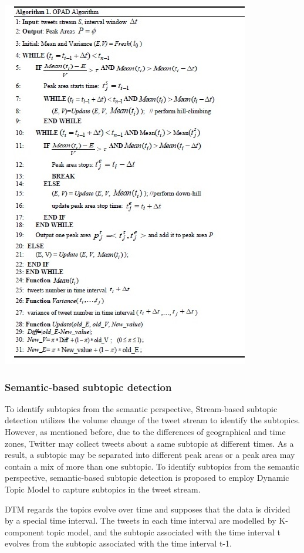 \documentclass[conference]{IEEEtran}
\begin{document}
\begin{center}
\includegraphics[scale=0.80]{OPAD1.jpg}
\end{center}


\subsubsection{\textbf{Semantic-based subtopic detection}}
\par To identify subtopics from the semantic perspective, Stream-based subtopic detection utilizes the volume change of the tweet stream to identify the subtopics. However, as mentioned before, due to the differences of geographical and time zones, Twitter may collect tweets about a same subtopic at different times. As a result, a subtopic may be separated into different peak areas or a peak area may contain a mix of more than one subtopic. To identify subtopics from the semantic perspective, semantic-based subtopic detection is proposed to employ Dynamic Topic Model to capture subtopics in the tweet stream.

\par DTM regards the topics evolve over time and supposes that the data is divided by a special time interval. The tweets in each time interval are modelled by K-component topic model, and the subtopic associated with the time interval t evolves from the subtopic associated with the time interval t-1.
\end{document}
